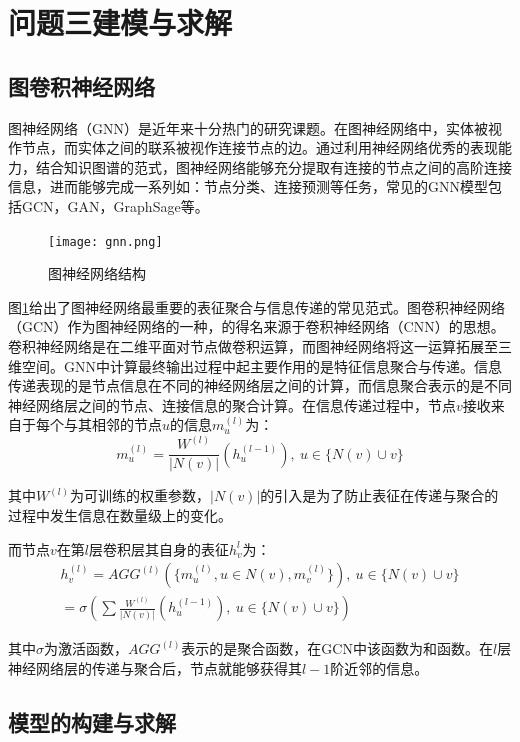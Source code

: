 \documentclass[bwprint]{gmcmthesis}
\begin{document}
\section{问题三建模与求解}

\subsection{图卷积神经网络}

图神经网络（GNN）是近年来十分热门的研究课题。在图神经网络中，实体被视作节点，而实体之间的联系被视作连接节点的边。通过利用神经网络优秀的表现能力，结合知识图谱的范式，图神经网络能够充分提取有连接的节点之间的高阶连接信息，进而能够完成一系列如：节点分类、连接预测等任务，常见的GNN模型包括GCN\cite{kipf_gcn_2017}，GAN\cite{peter_gan_2017}，GraphSage\cite{hamilton_graphsage_2017}等。

\begin{figure}[!h]
\centering
\texttt{[image: gnn.png]}
\caption{图神经网络结构}
\label{gnn}
\end{figure}


图\ref{gnn}给出了图神经网络最重要的表征聚合与信息传递的常见范式。图卷积神经网络（GCN）作为图神经网络的一种，的得名来源于卷积神经网络（CNN）的思想。卷积神经网络是在二维平面对节点做卷积运算，而图神经网络将这一运算拓展至三维空间。GNN中计算最终输出过程中起主要作用的是特征信息聚合与传递。信息传递表现的是节点信息在不同的神经网络层之间的计算，而信息聚合表示的是不同神经网络层之间的节点、连接信息的聚合计算。在信息传递过程中，节点$v$接收来自于每个与其相邻的节点$u$的信息$m_{u}^{(l)}$为：
\begin{equation}
  m_{u}^{(l)} = \frac{W^{(l)}}{|N(v)|}(h_u^{(l-1)}), \ u \in \{N(v) \cup v\}
\end{equation}

其中$W^{(l)}$为可训练的权重参数，$|N(v)|$的引入是为了防止表征在传递与聚合的过程中发生信息在数量级上的变化。

而节点$v$在第$l$层卷积层其自身的表征$h_v^{l}$为：
\begin{gather}
	h_{v}^{(l)} = AGG^{(l)}(\{m_u^{(l)}, u \in N(v), m_v^{(l)}\}), \ u \in \{N(v) \cup v\} \\ 
	= \sigma(\sum \frac{W^{(l)}}{|N(v)|}(h_u^{(l-1)}), \ u \in \{N(v) \cup v\})
\end{gather}

其中$\sigma$为激活函数，$AGG^{(l)}$表示的是聚合函数，在GCN中该函数为和函数。在$l$层神经网络层的传递与聚合后，节点就能够获得其$l-1$阶近邻的信息。

\subsection{模型的构建与求解}
\end{document}
